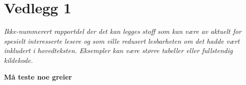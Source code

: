 \section{Vedlegg 1}
\label{sec:vedlegg1}
\textit{Ikke-nummerert rapportdel der det kan legges stoff som kan være av aktuelt for spesielt interesserte lesere og som ville redusert lesbarheten om det hadde vært inkludert i hovedteksten. Eksempler kan være større tabeller eller fullstendig kildekode.}

\textbf{Må teste noe greier}

